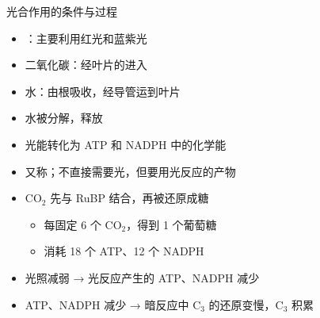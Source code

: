 \begin{notesheet}{光合作用的条件与过程}

\begin{itemize}
    \item {}：主要利用红光和蓝紫光
    \item 二氧化碳：经叶片的进入
    \item 水：由根吸收，经导管运到叶片
\end{itemize}

\begin{itemize}
    \item 水被分解，释放
    \item 光能转化为 ATP 和 NADPH 中的化学能
\end{itemize}
\begin{itemize}
    \item 又称；不直接需要光，但要用光反应的产物
    \item CO$_2$ 先与 RuBP 结合，再被还原成糖
    \begin{itemize}
        \item 每固定 6 个 CO$_2$，得到 1 个葡萄糖
        \item 消耗 18 个 ATP、12 个 NADPH
    \end{itemize}
\end{itemize}

\begin{itemize}
    \item 光照减弱 → 光反应产生的 ATP、NADPH 减少
    \item ATP、NADPH 减少 → 暗反应中 C$_3$ 的还原变慢，C$_3$ 积累
\end{itemize}
\end{notesheet}

